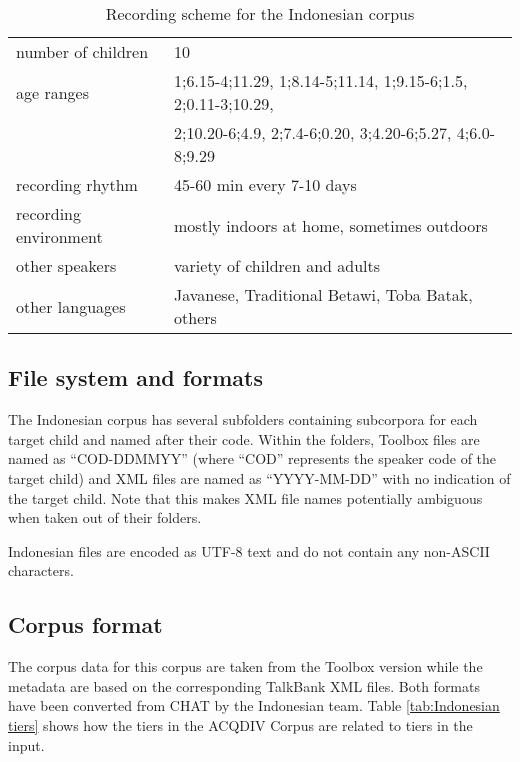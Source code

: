 \documentclass[a4paper, 11pt]{book}
\begin{document}
\begin{table}[ht]
	\centering
	\begin{tabular}{ll}
		\toprule
		number of children 	& 10 \\
		age ranges 			& 1;6.15-4;11.29, 1;8.14-5;11.14, 1;9.15-6;1.5, 2;0.11-3;10.29, \\
							& 2;10.20-6;4.9, 2;7.4-6;0.20, 3;4.20-6;5.27, 4;6.0-8;9.29 \\
		recording rhythm 	& 45-60 min every 7-10 days \\
		recording environment & mostly indoors at home, sometimes outdoors \\
		other speakers 		& variety of children and adults \\
		other languages		& Javanese, Traditional Betawi, Toba Batak, others \\
		\bottomrule
	\end{tabular}
	\caption{Recording scheme for the Indonesian corpus}
	\label{tab:Indonesian recording scheme}
\end{table}

\subsection{File system and formats}

The Indonesian corpus has several subfolders containing subcorpora for each target child and named after their code. Within the folders, Toolbox files are named as “COD-DDMMYY” (where “COD” represents the speaker code of the target child) and XML files are named as “YYYY-MM-DD” with no indication of the target child. Note that this makes XML file names potentially ambiguous when taken out of their folders. 

Indonesian files are encoded as UTF-8 text and do not contain any non-ASCII characters. 

\subsection{Corpus format}

The corpus data for this corpus are taken from the Toolbox version while the metadata are based on the corresponding TalkBank XML files. Both formats have been converted from CHAT by the Indonesian team. Table \autoref{tab:Indonesian tiers} shows how the tiers in the ACQDIV Corpus are related to tiers in the input.
\end{document}
